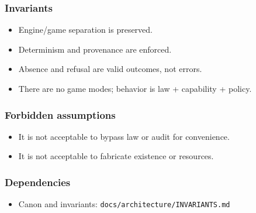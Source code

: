 \documentclass[9pt,a4paper,openany]{book}
\begin{document}
\subsubsection{Invariants}


\begin{itemize}
\item Engine/\allowbreak{}game separation is preserved.\allowbreak{}
\end{itemize}


\begin{itemize}
\item Determinism and provenance are enforced.\allowbreak{}
\end{itemize}


\begin{itemize}
\item Absence and refusal are valid outcomes, not errors.\allowbreak{}
\end{itemize}


\begin{itemize}
\item There are no game modes; behavior is law + capability + policy.\allowbreak{}
\end{itemize}





\subsubsection{Forbidden assumptions}


\begin{itemize}
\item It is not acceptable to bypass law or audit for convenience.\allowbreak{}
\end{itemize}


\begin{itemize}
\item It is not acceptable to fabricate existence or resources.\allowbreak{}
\end{itemize}





\subsubsection{Dependencies}


\begin{itemize}
\item Canon and invariants: \texttt{docs/\allowbreak{}architecture/\allowbreak{}INVARIANTS.\allowbreak{}md}
\end{itemize}
\end{document}
